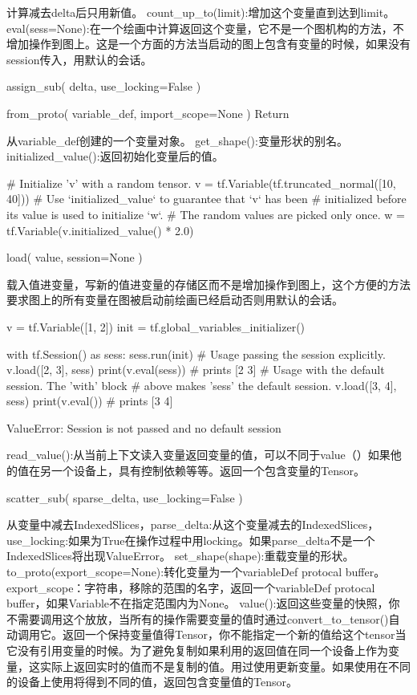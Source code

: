 计算减去delta后只用新值。
count\_up\_to(limit):增加这个变量直到达到limit。\newline
eval(sess=None):在一个绘画中计算返回这个变量，它不是一个图机构的方法，不增加操作到图上。这是一个方面的方法当启动的图上包含有变量的时候，如果没有session传入，用默认的会话。
\begin{python}
assign_sub(
    delta,
    use_locking=False
)
\end{python}
\begin{python}
from_proto(
    variable_def,
    import_scope=None
)
Return
\end{python}
从variable\_def创建的一个变量对象。\newline
get\_shape():变量形状的别名。\newline
initialized\_value():返回初始化变量后的值。
\begin{python}
# Initialize 'v' with a random tensor.
v = tf.Variable(tf.truncated_normal([10, 40]))
# Use `initialized\_value` to guarantee that `v` has been
# initialized before its value is used to initialize `w`.
# The random values are picked only once.
w = tf.Variable(v.initialized_value() * 2.0)
\end{python}
\begin{python}
load(
    value,
    session=None
)
\end{python}
载入值进变量，写新的值进变量的存储区而不是增加操作到图上，这个方便的方法要求图上的所有变量在图被启动前绘画已经启动否则用默认的会话。
\begin{python}
v = tf.Variable([1, 2])
init = tf.global_variables_initializer()

with tf.Session() as sess:
    sess.run(init)
    # Usage passing the session explicitly.
    v.load([2, 3], sess)
    print(v.eval(sess)) # prints [2 3]
    # Usage with the default session.  The 'with' block
    # above makes 'sess' the default session.
    v.load([3, 4], sess)
    print(v.eval()) # prints [3 4]
\end{python}
ValueError: Session is not passed and no default session

read\_value():从当前上下文读入变量返回变量的值，可以不同于value（）如果他的值在另一个设备上，具有控制依赖等等。返回一个包含变量的Tensor。
\begin{python}
scatter_sub(
    sparse_delta,
    use_locking=False
)
\end{python}
从变量中减去IndexedSlices，parse\_delta:从这个变量减去的IndexedSlices，use\_locking:如果为True在操作过程中用locking。如果parse\_delta不是一个IndexedSlices将出现ValueError。
set\_shape(shape):重载变量的形状。\newline
to\_proto(export\_scope=None):转化变量为一个variableDef protocal buffer。export\_scope：字符串，移除的范围的名字，返回一个variableDef protocal buffer，如果Variable不在指定范围内为None。\newline
value():返回这些变量的快照，你不需要调用这个放放，当所有的操作需要变量的值时通过convert\_to\_tensor()自动调用它。返回一个保持变量值得Tensor，你不能指定一个新的值给这个tensor当它没有引用变量的时候。为了避免复制如果利用的返回值在同一个设备上作为变量，这实际上返回实时的值而不是复制的值。用过使用更新变量。如果使用在不同的设备上使用将得到不同的值，返回包含变量值的Tensor。
